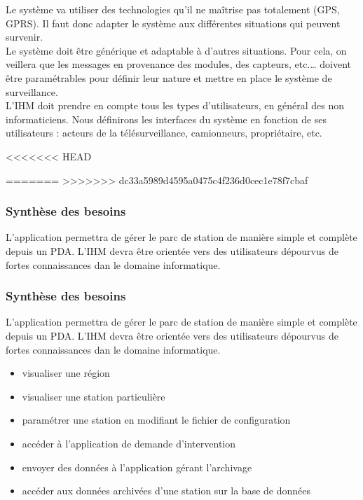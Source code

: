 Le système va utiliser des technologies qu'il ne maîtrise pas totalement (GPS, GPRS). Il faut donc 
adapter le système aux différentes situations qui peuvent survenir.\\

Le système doit être générique et adaptable à d'autres situations. Pour cela, on veillera que les 
messages en provenance des modules, des capteurs, etc.… doivent être paramétrables pour définir 
leur nature et mettre en place le système de surveillance.\\

L'IHM doit prendre en compte tous les types d'utilisateurs, en général des non informaticiens. 
Nous définirons les interfaces du système en fonction de ses utilisateurs : 
acteurs de la télésurveillance, camionneurs, propriétaire, etc.
 

<<<<<<< HEAD


=======
>>>>>>> dc33a5989d4595a0475c4f236d0cec1e78f7cbaf
\subsubsection{Synthèse des besoins}
L'application permettra de gérer le parc de station de manière simple et complète depuis un PDA. 
L'IHM devra être orientée vers des utilisateurs dépourvus de fortes connaissances dan le domaine informatique.\\

\subsubsection{Synthèse des besoins}
L'application permettra de gérer le parc de station de manière simple et complète depuis un PDA. L'IHM devra être orientée vers des utilisateurs dépourvus de fortes connaissances dan le domaine informatique.\\


\begin{itemize}
\item   visualiser une région 
\item	visualiser une station particulière 
\item	paramétrer une station en modifiant le fichier de configuration 
\item	accéder à l'application de demande d'intervention 
\item	envoyer des données à l'application gérant l'archivage 
\item	accéder aux données archivées d'une station sur la base de données
\end{itemize}


